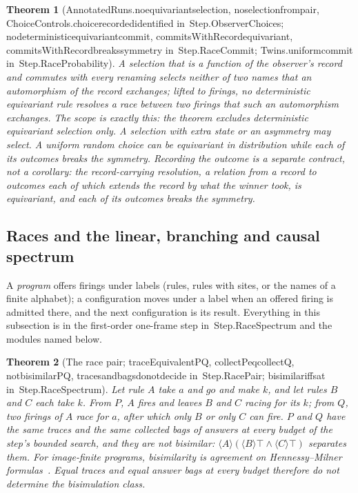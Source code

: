 \documentclass[11pt]{article}
\newtheorem{theorem}{Theorem}
\theoremstyle{remark}
\newcommand{\lean}[1]{{\ttfamily\def\_{\textunderscore\allowbreak}#1}}
\newcommand{\inmod}[1]{in~{\ttfamily\def\_{\textunderscore\allowbreak}#1}}
\begin{document}
\begin{theorem}[\lean{AnnotatedRuns.no\_equivariant\_selection}, \lean{no\_selection\_from\_pair}, \lean{ChoiceControls.choice\_recorded\_identified} \inmod{Step.ObserverChoices}; \lean{no\_deterministic\_equivariant\_commit}, \lean{commitsWithRecord\_equivariant}, \lean{commitsWithRecord\_breaks\_symmetry} \inmod{Step.RaceCommit}; \lean{Twins.uniform\_commit} \inmod{Step.RaceProbability}]
A selection that is a function of the observer's record and commutes with every renaming selects
neither of two names that an automorphism of the record exchanges; lifted to firings, no deterministic
equivariant rule resolves a race between two firings that such an automorphism exchanges. The scope is
exactly this: the theorem excludes \emph{deterministic} equivariant selection only. A selection with
extra state or an asymmetry may select. A uniform random choice can be equivariant in distribution
while each of its outcomes breaks the symmetry. Recording the outcome is a separate contract, not a
corollary: the record-carrying resolution, a relation from a record to outcomes each of which extends
the record by what the winner took, is equivariant, and each of its outcomes breaks the symmetry.
\end{theorem}

\subsection{Races and the linear, branching and causal spectrum}

A \emph{program} offers firings under labels (rules, rules with sites, or the names of a finite
alphabet); a configuration moves under a label when an offered firing is admitted there, and the next
configuration is its result. Everything in this subsection is in the first-order one-frame step
\inmod{Step.RaceSpectrum} and the modules named below.

\begin{theorem}[The race pair; \lean{traceEquivalent\_P\_Q}, \lean{collect\_P\_eq\_collect\_Q}, \lean{not\_bisimilar\_P\_Q}, \lean{traces\_and\_bags\_do\_not\_decide} \inmod{Step.RacePair}; \lean{bisimilar\_iff\_sat} \inmod{Step.RaceSpectrum}]
Let rule $A$ take $a$ and $\mathit{go}$ and make $k$, and let rules $B$ and $C$ each take $k$. From $P$, $A$
fires and leaves $B$ and $C$ racing for its $k$; from $Q$, two firings of $A$ race for $a$, after which only
$B$ or only $C$ can fire. $P$ and $Q$ have the same traces and the same collected bags of answers at
every budget of the step's bounded search, and they are not bisimilar: $\langle A\rangle(\langle
B\rangle\top\wedge\langle C\rangle\top)$ separates them. For image-finite programs, bisimilarity is
agreement on Hennessy--Milner formulas~\cite{hennessymilner85}. Equal traces and equal answer bags at
every budget therefore do not determine the bisimulation class.
\end{theorem}
\end{document}
